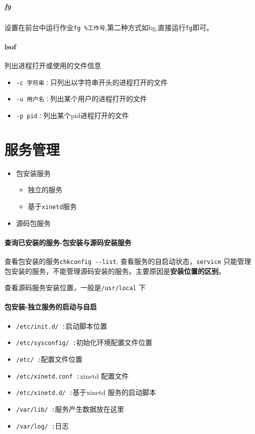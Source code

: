 \documentclass[UTF8,a4paper,12pt]{ctexbook}
\begin{document}
			\subparagraph{fg}设置在前台中运行作业\verb|fg %工作号|,第二种方式如bg,直接运行\verb|fg|即可。
		
		\paragraph{lsof} 列出进程打开或使用的文件信息
			\begin{itemize}
				\item \verb|-c 字符串：|只列出以字符串开头的进程打开的文件
				\item \verb|-u 用户名：|列出某个用户的进程打开的文件
				\item \verb|-p pid：|列出某个pid进程打开的文件
			\end{itemize}	
			
	\section{服务管理}
		\begin{itemize}
			\item 包安装服务
				\begin{itemize}
					\item 独立的服务
					\item 基于\verb|xinetd|服务		
				\end{itemize}
			\item 源码包服务 
		\end{itemize}	
	
		\paragraph{查询已安装的服务-包安装与源码安装服务}
			查看包安装的服务\verb|chkconfig --list|, 查看服务的自启动状态，\verb|service| 只能管理包安装的服务，不能管理源码安装的服务。主要原因是\textbf{安装位置的区别}。
		
			查看源码服务安装位置，一般是\verb|/usr/local| 下
			
		\paragraph{包安装-独立服务的启动与自启}
			\begin{itemize}
				\item \verb|/etc/init.d/ :|启动脚本位置
				\item \verb|/etc/sysconfig/ :|初始化环境配置文件位置
				\item \verb|/etc/ :|配置文件位置
				\item \verb|/etc/xinetd.conf :|xinetd 配置文件
				\item \verb|/etc/xinetd.d/ :|基于xinetd 服务的启动脚本
				\item \verb|/var/lib/ :|服务产生数据放在这里 
				\item \verb|/var/log/ :|日志
			\end{itemize}
			
\end{document}
